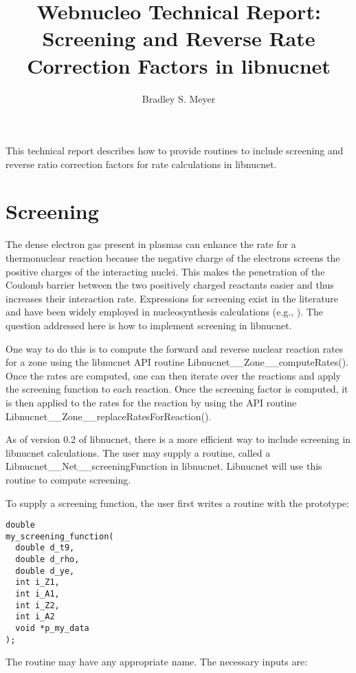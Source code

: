 \documentclass{article}    %
\title{Webnucleo Technical Report: Screening and Reverse Rate Correction
Factors in libnucnet}  %
\author{Bradley S. Meyer}
\begin{document}

\maketitle                 %


This technical report describes how to provide routines to include
screening and reverse ratio correction factors for rate calculations
in libnucnet.

\section{Screening}

The dense electron gas present in plasmas can enhance the rate for a
thermonuclear reaction because the negative charge of the electrons screens
the positive charges of the interacting nuclei.  This makes the penetration
of the Coulomb barrier between the two positively charged reactants easier
and thus increases their interaction rate.
Expressions for screening exist in the literature and have been widely
employed in nucleosynthesis calculations (e.g., \cite{1982ApJ...258..696W}).
The question addressed here is how to implement screening in libnucnet.

One way to do this is to compute the forward and reverse nuclear reaction
rates for a zone using the libnucnet API routine
Libnucnet\_\_Zone\_\_computeRates().
Once the rates are computed, one can
then iterate over the reactions and apply the screening function to each
reaction.  Once the screening factor is computed, it is then applied to
the rates for the reaction by using the API routine
Libnucnet\_\_Zone\_\_replaceRatesForReaction().

As of version 0.2 of libnucnet, there is a more efficient way to include
screening in libnucnet calculations.  The user may supply a routine,
called a Libnucnet\_\_Net\_\_screeningFunction in libnucnet.  Libnucnet
will use this routine to compute screening.

To supply a screening function, the user first writes a routine with the
prototype:

\begin{verbatim}
double
my_screening_function(
  double d_t9,
  double d_rho,
  double d_ye,
  int i_Z1,
  int i_A1,
  int i_Z2,
  int i_A2
  void *p_my_data
);
\end{verbatim}

The routine may have any appropriate name.  The necessary inputs are:
\end{document}

